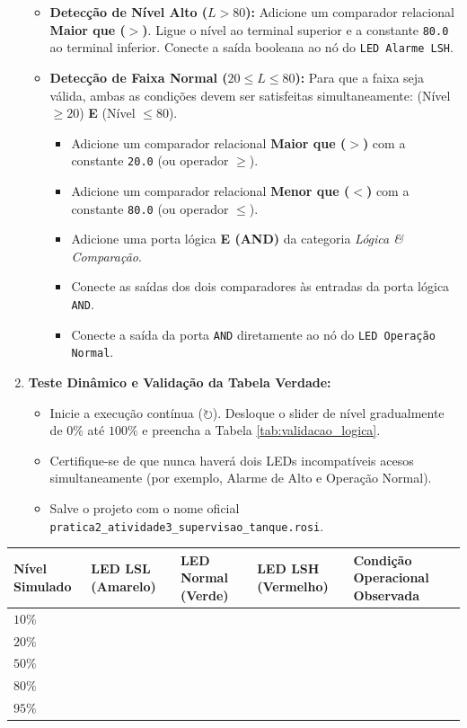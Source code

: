 \documentclass[11pt,a4paper]{article}
\begin{document}
\begin{enumerate}
\begin{itemize}
        \item \textbf{Detecção de Nível Alto ($L > 80$):} Adicione um comparador relacional \textbf{Maior que ($>$)}. Ligue o nível ao terminal superior e a constante \texttt{80.0} ao terminal inferior. Conecte a saída booleana ao nó do \texttt{LED Alarme LSH}.
        \item \textbf{Detecção de Faixa Normal ($20 \le L \le 80$):}
        Para que a faixa seja válida, ambas as condições devem ser satisfeitas simultaneamente: (Nível $\ge 20$) \textbf{E} (Nível $\le 80$).
        \begin{itemize}
            \item Adicione um comparador relacional \textbf{Maior que ($>$)} com a constante \texttt{20.0} (ou operador $\ge$).
            \item Adicione um comparador relacional \textbf{Menor que ($<$)} com a constante \texttt{80.0} (ou operador $\le$).
            \item Adicione uma porta lógica \textbf{E (AND)} da categoria \textit{Lógica \& Comparação}.
            \item Conecte as saídas dos dois comparadores às entradas da porta lógica \texttt{AND}.
            \item Conecte a saída da porta \texttt{AND} diretamente ao nó do \texttt{LED Operação Normal}.
        \end{itemize}
    \end{itemize}
    \item \textbf{Teste Dinâmico e Validação da Tabela Verdade:}
    \begin{itemize}
        \item Inicie a execução contínua ($\circlearrowright$). Desloque o slider de nível gradualmente de $0\%$ até $100\%$ e preencha a Tabela \ref{tab:validacao_logica}.
        \item Certifique-se de que nunca haverá dois LEDs incompatíveis acesos simultaneamente (por exemplo, Alarme de Alto e Operação Normal).
        \item Salve o projeto com o nome oficial \texttt{pratica2\_atividade3\_supervisao\_tanque.rosi}.
    \end{itemize}
\end{enumerate}

\begin{center}
\label{tab:validacao_logica}
\scriptsize
\renewcommand{\arraystretch}{0.95}
\begin{tabularx}{\textwidth}{C{2.0cm} Y Y Y L{5.4cm}}
\toprule
\textbf{Nível Simulado} & \textbf{LED LSL (Amarelo)} & \textbf{LED Normal (Verde)} & \textbf{LED LSH (Vermelho)} & \textbf{Condição Operacional Observada} \\
\midrule
$10\%$ & & & & \\
$20\%$ & & & & \\
$50\%$ & & & & \\
$80\%$ & & & & \\
$95\%$ & & & & \\
\bottomrule
\end{tabularx}
\end{center}
\end{document}
